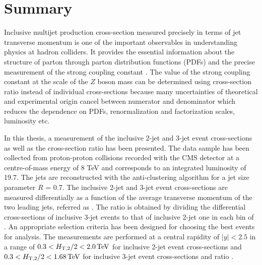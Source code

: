 \chapter{Summary}
\label{chap:Summary}
Inclusive multijet production cross-section measured precisely in terms of jet transverse momentum is one of the important observables in understanding physics at hadron colliders. It provides the essential information about the structure of parton through parton distribution functions (PDFs) and the precise measurement of the strong coupling constant \alps. The value of the strong coupling constant at the scale of the $Z$ boson mass \alpsmz can be determined using cross-section ratio instead of individual cross-sections because many uncertainties of theoretical and experimental origin cancel between numerator and denominator which reduces the dependence on PDFs, renormalization and factorization scales, luminosity etc.

In this thesis, a measurement of the inclusive 2-jet and 3-jet event cross-sections as well as the cross-section ratio \ratio has been presented. The data sample has been collected from proton-proton collisions recorded with the CMS detector at a centre-of-mass energy of 8 TeV and corresponds to an integrated luminosity of 19.7\fbinv. The jets are reconstructed with the anti-\kt clustering algorithm for a jet size parameter $R$ = 0.7. The inclusive 2-jet and 3-jet event cross-sections are measured differentially as a function of the average transverse momentum of the two leading jets, referred as \httwo. The ratio \ratio is obtained by dividing the differential cross-sections of inclusive 3-jet events to that of inclusive 2-jet one in each bin of \httwo. An appropriate selection criteria has been designed for choosing the best events for analysis. The measurements are performed at a central rapidity of $|y|<2.5$ in a range of $0.3 < H_{\mathrm{T,2}}/2 < 2.0\,\text{Te\hspace{-.08em}V}$ for inclusive 2-jet event cross-sections and $0.3 < H_{\mathrm{T,2}}/2 < 1.68\,\text{Te\hspace{-.08em}V}$ for inclusive 3-jet event cross-sections and ratio \ratio. 

